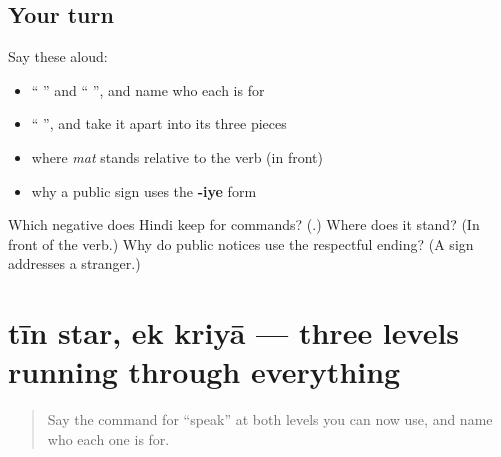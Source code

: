 \subsection*{Your turn}
Say these aloud:

\begin{itemize}
\raggedright
  \item \textquotedblleft{} \textquotedblright{} and \textquotedblleft{} \textquotedblright{}, and name who each is for
  \item \textquotedblleft{}  \textquotedblright{}, and take it apart into its three pieces
  \item where \emph{mat} stands relative to the verb (in front)
  \item why a public sign uses the \textbf{-iye} form
\end{itemize}

\begin{tcolorbox}[breakable,colback=teal!4,colframe=teal!35!black,title={Before you move on}]
Which negative does Hindi keep for commands? (\textbf{}.) Where does it stand? (In front of the verb.) Why do public notices use the respectful ending? (A sign addresses a stranger.)
\end{tcolorbox}
\section[\texorpdfstring{\hi{तीन} \hi{स्तर}, \hi{एक} \hi{क्रिया} (tīn star, ek kriyā)}{तीन स्तर, एक क्रिया (tīn star, ek kriyā)}]{tīn star, ek kriyā — three levels running through everything}

\label{lesson:HI-C85-repaso-adesh}



\begin{quote}
Say the command for \textquotedblleft{}speak\textquotedblright{} at both levels you can now use, and name who each one is for.
\end{quote}

